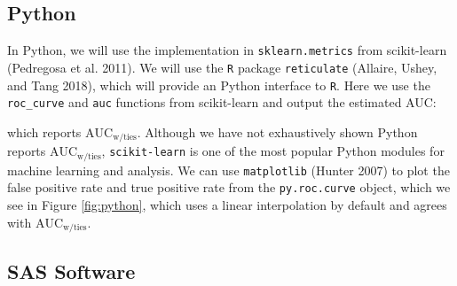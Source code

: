 \documentclass[smallextended]{svjour3}       %
\newenvironment{Shaded}{\begin{snugshade}}{\end{snugshade}}
\newcommand{\CommentTok}[1]{\textcolor[rgb]{0.56,0.35,0.01}{\textit{#1}}}
\newcommand{\DataTypeTok}[1]{\textcolor[rgb]{0.13,0.29,0.53}{#1}}
\newcommand{\DecValTok}[1]{\textcolor[rgb]{0.00,0.00,0.81}{#1}}
\newcommand{\FloatTok}[1]{\textcolor[rgb]{0.00,0.00,0.81}{#1}}
\newcommand{\KeywordTok}[1]{\textcolor[rgb]{0.13,0.29,0.53}{\textbf{#1}}}
\newcommand{\NormalTok}[1]{#1}
\newcommand{\OperatorTok}[1]{\textcolor[rgb]{0.81,0.36,0.00}{\textbf{#1}}}
\newcommand{\StringTok}[1]{\textcolor[rgb]{0.31,0.60,0.02}{#1}}
\begin{document}
\hypertarget{python}{%
\subsection{Python}\label{python}}

In Python, we will use the implementation in \texttt{sklearn.metrics}
from {\selectfont scikit-learn} (Pedregosa et al. 2011).
We will use the \texttt{R} package \texttt{reticulate} (Allaire, Ushey,
and Tang 2018), which will provide an Python interface to \texttt{R}.
Here we use the \texttt{roc\_curve} and \texttt{auc} functions from
{\selectfont scikit-learn} and output the estimated AUC:

\begin{Shaded}
\end{Shaded}

which reports \(\text{AUC}_{\text{w/ties}}\). Although we have not
exhaustively shown Python reports \(\text{AUC}_{\text{w/ties}}\),
\texttt{scikit-learn} is one of the most popular Python modules for
machine learning and analysis. We can use \texttt{matplotlib} (Hunter
2007) to plot the false positive rate and true positive rate from the
\texttt{py.roc.curve} object, which we see in Figure \ref{fig:python},
which uses a linear interpolation by default and agrees with
\(\text{AUC}_{\text{w/ties}}\).

\hypertarget{sas-software}{%
\subsection{SAS Software}\label{sas-software}}
\end{document}
